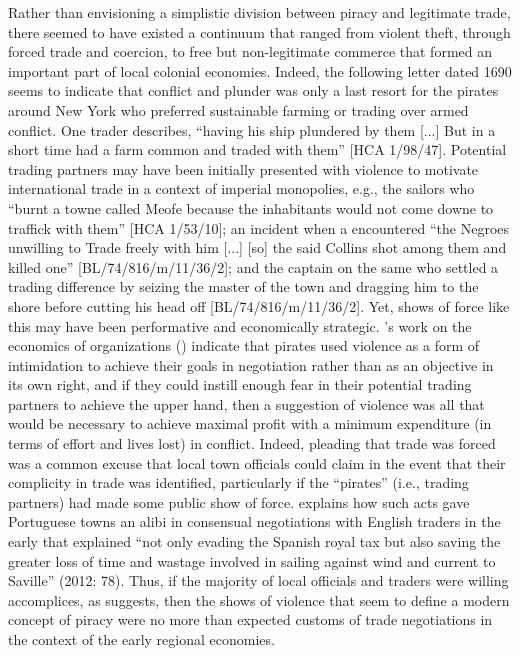 Rather than envisioning a simplistic division between piracy and legitimate trade, there seemed to have existed a continuum that ranged from violent theft, through forced trade and coercion, to free but non-legitimate commerce that formed an important part of local colonial economies. Indeed, the following letter dated 1690 seems to indicate that conflict and plunder was only a last resort for the pirates around New York who preferred sustainable farming or trading over armed conflict. One trader describes, “having his ship plundered by them [...] But in a short time had a farm common and traded with them” [HCA 1/98/47]. Potential trading partners may have been initially presented with violence to motivate international trade in a context of imperial monopolies, e.g., the sailors who “burnt a towne called Meofe because the inhabitants would not come downe to traffick with them” [HCA 1/53/10]; an incident when a  encountered “the Negroes unwilling to Trade freely with him [...] [so] the said Collins shot among them and killed one” [BL/74/816/m/11/36/2]; and the captain on the same  who settled a trading difference by seizing the master of the town and dragging him to the shore before cutting his head off [BL/74/816/m/11/36/2]. Yet, shows of force like this may have been performative and economically strategic. \citeauthor{Leeson2007}’s work on the economics of  organizations (\citeyear{Leeson2007,Leeson2008}) indicate that pirates used violence as a form of intimidation to achieve their goals in negotiation rather than as an objective in its own right, and if they could instill enough fear in their potential trading partners to achieve the upper hand, then a suggestion of violence was all that would be necessary to achieve maximal profit with a minimum expenditure (in terms of effort and lives lost) in conflict. Indeed, pleading that trade was forced was a common excuse that local town officials could claim in the event that their complicity in  trade was identified, particularly if the “pirates” (i.e., trading partners) had made some public show of force. \citeauthor{Bicheno2012} explains how such acts gave Portuguese towns an alibi in consensual negotiations with English traders in the early  that explained “not only evading the Spanish royal tax but also saving the greater loss of time and wastage involved in sailing against wind and current to Saville” (2012: 78). Thus, if the majority of local officials and traders were willing accomplices, as \citeauthor{Bicheno2012} suggests, then the shows of violence that seem to define a modern concept of piracy were no more than expected customs of trade negotiations in the context of the early regional economies. 

